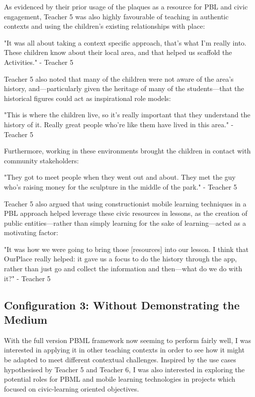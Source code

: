 As evidenced by their prior usage of the plaques as a resource for PBL and civic engagement, Teacher 5 was also highly favourable of teaching in authentic contexts and using the children's existing relationships with place: 

\begin{displayquote}
"It was all about taking a context specific approach, that's what I'm really into. These children know about their local area, and that helped us scaffold the Activities." - Teacher 5
\end{displayquote}

Teacher 5 also noted that many of the children were not aware of the area's history, and---particularly given the heritage of many of the students---that the historical figures could act as inspirational role models: 

\begin{displayquote}
"This is where the children live, so it's really important that they understand the history of it. Really great people who're like them have lived in this area." - Teacher 5
\end{displayquote}

Furthermore, working in these environments brought the children in contact with community stakeholders: 

\begin{displayquote}
"They got to meet people when they went out and about. They met the guy who's raising money for the sculpture in the middle of the park." - Teacher 5
\end{displayquote}

Teacher 5 also argued that using constructionist mobile learning techniques in a PBL approach helped leverage these civic resources in lessons, as the creation of public entities---rather than simply learning for the sake of learning---acted as a motivating factor: 

\begin{displayquote}
"It was how we were going to bring those [resources] into our lesson. I think that OurPlace really helped: it gave us a focus to do the history through the app, rather than just go and collect the information and then---what do we do with it?" - Teacher 5
\end{displayquote}

\subsection{Configuration 3: Without Demonstrating the Medium}
With the full version PBML framework now seeming to perform fairly well, I was interested in applying it in other teaching contexts in order to see how it might be adapted to meet different contextual challenges. Inspired by the use cases hypothesised by Teacher 5 and Teacher 6, I was also interested in exploring the potential roles for PBML and mobile learning technologies in projects which focused on civic-learning oriented objectives.

